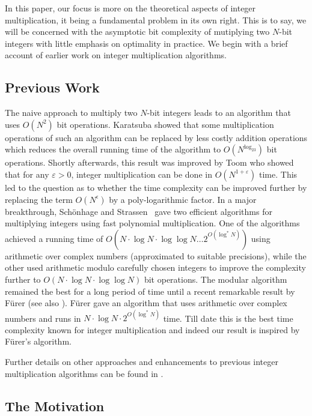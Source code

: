 \documentclass[11pt]{article}
\begin{document}
In this paper, our focus is more on the theoretical aspects of integer
multiplication, it being a fundamental problem in its own right. This
is to say, we will be concerned with the asymptotic bit complexity of
mutiplying two $N$-bit integers with little emphasis on optimality in
practice. We begin with a brief account of earlier work on integer
multiplication algorithms.

\subsection{Previous Work}

The naive approach to multiply two $N$-bit integers leads to an
algorithm that uses $O(N^2)$ bit operations. Karatsuba \cite{K63}
showed that some multiplication operations of such an algorithm can be
replaced by less costly addition operations which reduces the overall
running time of the algorithm to $O(N^{\log_23})$ bit
operations. Shortly afterwards, this result was improved by Toom
\cite{T63} who showed that for any $\varepsilon>0$, integer
multiplication can be done in $O(N^{1+\varepsilon})$ time. This led to
the question as to whether the time complexity can be improved further
by replacing the term $O(N^{\epsilon})$ by a poly-logarithmic
factor. In a major breakthrough, Sch\"{o}nhage and
Strassen~\cite{SS71} gave two efficient algorithms for multiplying
integers using fast polynomial multiplication. One of the algorithms
achieved a running time of $O(N\cdot \log N\cdot \log\log N\ldots
2^{O(\log^*N)})$ using arithmetic over complex numbers (approximated
to suitable precisions), while the other used arithmetic modulo
carefully chosen integers to improve the complexity further to
$O(N\cdot \log N\cdot \log\log N)$ bit operations. The modular
algorithm remained the best for a long period of time until a recent
remarkable result by F\"{u}rer \cite{F07} (see also
\cite{F09}). F\"{u}rer gave an algorithm that uses arithmetic over
complex numbers and runs in $N\cdot\log N\cdot 2^{O(\log^\ast N)}$
time. Till date this is the best time complexity known for integer
multiplication and indeed our result is inspired by F\"{u}rer's
algorithm.

Further details on other approaches and enhancements to previous
integer multiplication algorithms can be found in \cite{F09}.

\subsection{The Motivation}
\end{document}
